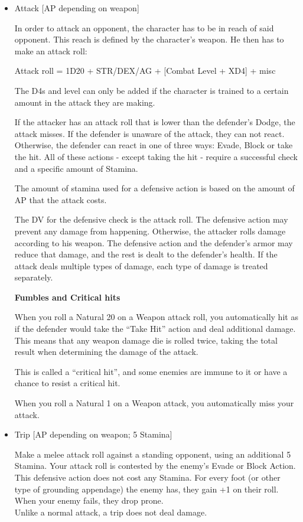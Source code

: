 \begin{itemize}

\item Attack [AP depending on weapon]

In order to attack an opponent, the character has to be in reach of said opponent. This reach is defined by the character's weapon. He then has to make an attack roll:

Attack roll = 1D20 + STR/DEX/AG + [Combat Level + XD4] + misc

The D4s and level can only be added if the character is trained to a certain amount in the attack they are making.

If the attacker has an attack roll that is lower than the defender's Dodge, the attack misses. If the defender is unaware of the attack, they can not react. Otherwise, the defender can react in one of three ways: Evade, Block or take the hit. All of these actions - except taking the hit - require a successful check and a specific amount of Stamina.

The amount of stamina used for a defensive action is based on the amount of  AP that the attack costs. 

The DV for the defensive check is the attack roll. The defensive action may prevent any damage from happening. Otherwise, the attacker rolls damage according to his weapon. The defensive action and the defender's armor may reduce that damage, and the rest is dealt to the defender's health. If the attack deals multiple types of damage, each type of damage is treated separately. 

\textbf{Fumbles and Critical hits}

When you roll a Natural 20 on a Weapon attack roll, you automatically hit as if the defender would take the “Take Hit” action and deal additional damage. This means that any weapon damage die is rolled twice, taking the total result when determining the damage of the attack.

This is called a “critical hit”, and some enemies are immune to it or have a chance to resist a critical hit.

When you roll a Natural 1 on a Weapon attack, you automatically miss your attack.


\item Trip [AP depending on weapon; 5 Stamina]

Make a melee attack roll against a standing opponent, using an additional 5 Stamina. Your attack roll is contested by the enemy's Evade or Block Action. This defensive action does not cost any Stamina. For every foot (or other type of grounding appendage) the enemy has, they gain +1 on their roll. When your enemy fails, they drop prone.\\
Unlike a normal attack, a trip does not deal damage.\\



\end{itemize}
